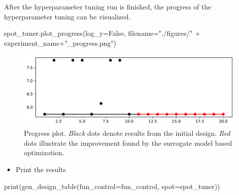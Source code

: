 \documentclass[
  letterpaper,
  DIV=11,
  numbers=noendperiod]{scrreprt}
\newenvironment{Shaded}{\begin{snugshade}}{\end{snugshade}}
\newcommand{\BuiltInTok}[1]{\textcolor[rgb]{0.00,0.23,0.31}{#1}}
\newcommand{\NormalTok}[1]{\textcolor[rgb]{0.00,0.23,0.31}{#1}}
\newcommand{\OperatorTok}[1]{\textcolor[rgb]{0.37,0.37,0.37}{#1}}
\newcommand{\StringTok}[1]{\textcolor[rgb]{0.13,0.47,0.30}{#1}}
\newcommand{\VariableTok}[1]{\textcolor[rgb]{0.07,0.07,0.07}{#1}}
\providecommand{\tightlist}{%
  \setlength{\itemsep}{0pt}\setlength{\parskip}{0pt}}\usepackage{longtable,booktabs,array}
\begin{document}
After the hyperparameter tuning run is finished, the progress of the
hyperparameter tuning can be visualized.

\begin{Shaded}
\begin{Highlighting}[]
\NormalTok{spot\_tuner.plot\_progress(log\_y}\OperatorTok{=}\VariableTok{False}\NormalTok{,}
\NormalTok{    filename}\OperatorTok{=}\StringTok{"./figures/"} \OperatorTok{+}\NormalTok{ experiment\_name}\OperatorTok{+}\StringTok{"\_progress.png"}\NormalTok{)}
\end{Highlighting}
\end{Shaded}

\begin{figure}[H]

{\centering \includegraphics{10_spot_hpt_sklearn_classification_files/figure-pdf/cell-22-output-1.pdf}

}

\caption{Progress plot. \emph{Black} dots denote results from the
initial design. \emph{Red} dots illustrate the improvement found by the
surrogate model based optimization.}

\end{figure}

\begin{itemize}
\tightlist
\item
  Print the results
\end{itemize}

\begin{Shaded}
\begin{Highlighting}[]
\BuiltInTok{print}\NormalTok{(gen\_design\_table(fun\_control}\OperatorTok{=}\NormalTok{fun\_control,}
\NormalTok{    spot}\OperatorTok{=}\NormalTok{spot\_tuner))}
\end{Highlighting}
\end{Shaded}
\end{document}
